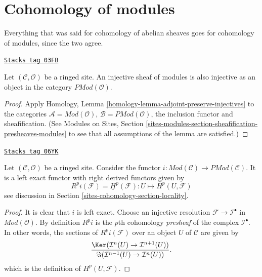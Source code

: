 \section{Cohomology of modules}
\label{sites-cohomology-section-cohomology-modules}
Everything that was said for cohomology of abelian sheaves
goes for cohomology of modules, since the two agree.

\begin{lemma}
\label{sites-cohomology-lemma-injective-module-injective-presheaf}
\href{https://stacks.math.columbia.edu/tag/03FB}{\texttt{Stacks tag 03FB}}

Let $(\mathcal{C}, \mathcal{O})$ be a ringed site.
An injective sheaf of modules is also injective as an
object in the category $\textit{PMod}(\mathcal{O})$.
\end{lemma}

\begin{proof}
Apply Homology, Lemma \ref{homology-lemma-adjoint-preserve-injectives}
to the categories $\mathcal{A} = \textit{Mod}(\mathcal{O})$,
$\mathcal{B} = \textit{PMod}(\mathcal{O})$, the inclusion functor
and sheafification. (See
Modules on Sites,
Section \ref{sites-modules-section-sheafification-presheaves-modules}
to see that all assumptions of the lemma are satisfied.)
\end{proof}

\begin{lemma}
\label{sites-cohomology-lemma-include-modules}
\href{https://stacks.math.columbia.edu/tag/06YK}{\texttt{Stacks tag 06YK}}

Let $(\mathcal{C}, \mathcal{O})$ be a ringed site.
Consider the functor
$i : \textit{Mod}(\mathcal{C}) \to \textit{PMod}(\mathcal{C})$.
It is a left exact functor with right derived functors given by
$$
R^pi(\mathcal{F}) = \underline{H}^p(\mathcal{F}) :
U \longmapsto H^p(U, \mathcal{F})
$$
see discussion in
Section \ref{sites-cohomology-section-locality}.
\end{lemma}

\begin{proof}
It is clear that $i$ is left exact.
Choose an injective resolution $\mathcal{F} \to \mathcal{I}^\bullet$
in $\textit{Mod}(\mathcal{O})$.
By definition $R^pi$ is the $p$th cohomology {\it presheaf}
of the complex $\mathcal{I}^\bullet$. In other words, the
sections of $R^pi(\mathcal{F})$ over an object $U$ of $\mathcal{C}$
are given by
$$
\frac{\Ker(\mathcal{I}^n(U) \to \mathcal{I}^{n + 1}(U))}
{\Im(\mathcal{I}^{n - 1}(U) \to \mathcal{I}^n(U))}.
$$
which is the definition of $H^p(U, \mathcal{F})$.
\end{proof}

